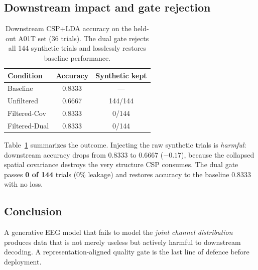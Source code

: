\subsection{Downstream impact and gate rejection}

\begin{table}[t]
  \centering
  \caption{Downstream CSP+LDA accuracy on the held-out A01T set (36 trials).
    The dual gate rejects all 144 synthetic trials and losslessly restores
    baseline performance.}
  \label{tab:results}
  \begin{tabular}{lcc}
    \toprule
    Condition & Accuracy & Synthetic kept \\
    \midrule
    Baseline        & 0.8333 & --- \\
    Unfiltered      & 0.6667 & 144/144 \\
    Filtered-Cov    & 0.8333 & 0/144 \\
    Filtered-Dual   & 0.8333 & 0/144 \\
    \bottomrule
  \end{tabular}
\end{table}

Table~\ref{tab:results} summarizes the outcome. Injecting the raw synthetic
trials is \emph{harmful}: downstream accuracy drops from $0.8333$ to $0.6667$
($-0.17$), because the collapsed spatial covariance destroys the very
structure CSP consumes. The dual gate passes \textbf{0 of 144} trials (0\%
leakage) and restores accuracy to the baseline $0.8333$ with no loss.

\subsection{Conclusion}

A generative EEG model that fails to model the \emph{joint channel
distribution} produces data that is not merely useless but actively harmful to
downstream decoding. A representation-aligned quality gate is the last line of
defence before deployment.

